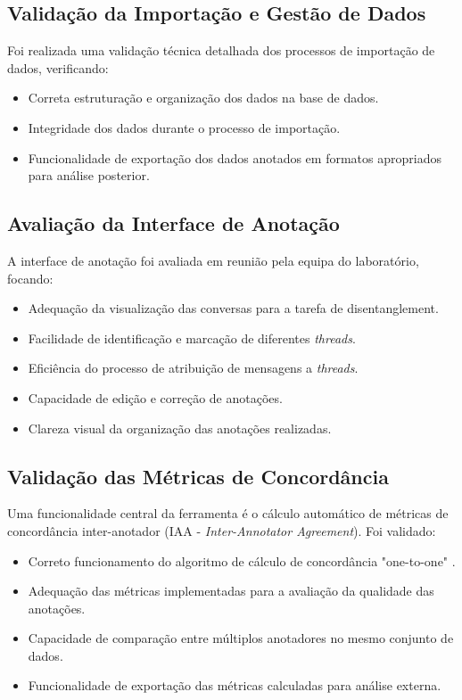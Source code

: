 \subsection{Validação da Importação e Gestão de Dados}
Foi realizada uma validação técnica detalhada dos processos de importação de dados, verificando:
\begin{itemize}
    \item Correta estruturação e organização dos dados na base de dados.
    \item Integridade dos dados durante o processo de importação.
    \item Funcionalidade de exportação dos dados anotados em formatos apropriados para análise posterior.
\end{itemize}

\subsection{Avaliação da Interface de Anotação}
A interface de anotação foi avaliada em reunião pela equipa do laboratório, focando:
\begin{itemize}
    \item Adequação da visualização das conversas para a tarefa de disentanglement.
    \item Facilidade de identificação e marcação de diferentes \textit{threads}.
    \item Eficiência do processo de atribuição de mensagens a \textit{threads}.
    \item Capacidade de edição e correção de anotações.
    \item Clareza visual da organização das anotações realizadas.
\end{itemize}

\subsection{Validação das Métricas de Concordância}
Uma funcionalidade central da ferramenta é o cálculo automático de métricas de concordância inter-anotador (IAA - \textit{Inter-Annotator Agreement}). Foi validado:
\begin{itemize}
    \item Correto funcionamento do algoritmo de cálculo de concordância "one-to-one" \cite{elsner2008you}.
    \item Adequação das métricas implementadas para a avaliação da qualidade das anotações.
    \item Capacidade de comparação entre múltiplos anotadores no mesmo conjunto de dados.
    \item Funcionalidade de exportação das métricas calculadas para análise externa.
\end{itemize}

